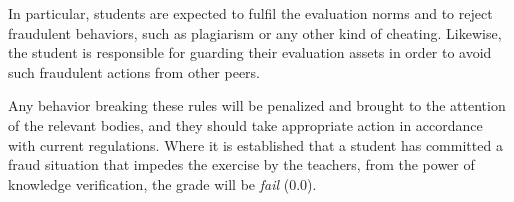 \documentclass[11pt, a4paper, twoside]{article}
\begin{document}
In particular, students are expected to fulfil the evaluation norms and to
reject fraudulent behaviors, such as plagiarism or any other kind of cheating.
Likewise, the student is responsible for guarding their evaluation assets in
order to avoid such fraudulent actions from other peers.

Any behavior breaking these rules will be penalized and brought to the
attention of the relevant bodies, and they should take appropriate action in
accordance with current regulations. Where it is established that a student has
committed a fraud situation that impedes the exercise by the teachers, from the
power of knowledge verification, the grade will be \emph{fail} (0.0).
\end{document}
